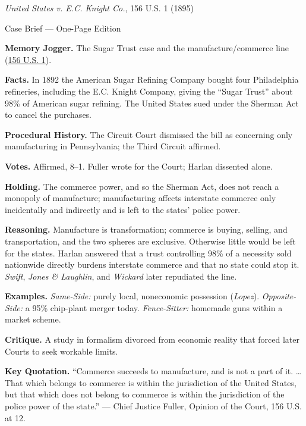 \documentclass[12pt]{article}
\begin{document}
\begin{center}
{\Large \textit{United States v. E.C. Knight Co.}, 156 U.S. 1 (1895)\par}
\vspace{0.3em}
{\normalsize Case Brief --- One-Page Edition\par}
\end{center}

\textbf{Memory Jogger.} The Sugar Trust case and the manufacture/commerce line (\href{https://supreme.justia.com/cases/federal/us/156/1/}{156 U.S. 1}).

\textbf{Facts.} In 1892 the American Sugar Refining Company bought four Philadelphia refineries, including the E.C. Knight Company, giving the ``Sugar Trust'' about 98\% of American sugar refining. The United States sued under the Sherman Act to cancel the purchases.

\textbf{Procedural History.} The Circuit Court dismissed the bill as concerning only manufacturing in Pennsylvania; the Third Circuit affirmed.

\textbf{Votes.} Affirmed, 8--1. Fuller wrote for the Court; Harlan dissented alone.

\textbf{Holding.} The commerce power, and so the Sherman Act, does not reach a monopoly of manufacture; manufacturing affects interstate commerce only incidentally and indirectly and is left to the states' police power.

\textbf{Reasoning.} Manufacture is transformation; commerce is buying, selling, and transportation, and the two spheres are exclusive. Otherwise little would be left for the states. Harlan answered that a trust controlling 98\% of a necessity sold nationwide directly burdens interstate commerce and that no state could stop it. \textit{Swift}, \textit{Jones \& Laughlin}, and \textit{Wickard} later repudiated the line.

\textbf{Examples.} \emph{Same-Side:} purely local, noneconomic possession (\textit{Lopez}). \emph{Opposite-Side:} a 95\% chip-plant merger today. \emph{Fence-Sitter:} homemade guns within a market scheme.

\textbf{Critique.} A study in formalism divorced from economic reality that forced later Courts to seek workable limits.

\textbf{Key Quotation.} ``Commerce succeeds to manufacture, and is not a part of it. \ldots That which belongs to commerce is within the jurisdiction of the United States, but that which does not belong to commerce is within the jurisdiction of the police power of the state.'' --- Chief Justice Fuller, Opinion of the Court, 156 U.S. at 12.
\end{document}
